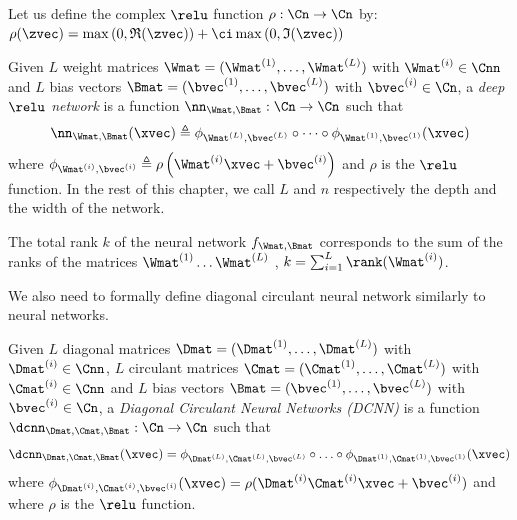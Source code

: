 \begin{definition}
  Let us define the complex $\relu$ function $\rho: \Cn \rightarrow \Cn$ by: $\rho(\zvec) = \max\left(0, \mathfrak{R}(\zvec)\right) + \ci \max\left(0, \mathfrak{I}(\zvec) \right)$
  \label{definition:relu_function}
\end{definition}

\begin{definition} \label{definition:deep_relu_network}
  Given $L$ weight matrices $\Wmat = (\Wmat^{(1)}, \ldots, \Wmat^{(L)})$ with $\Wmat^{(i)} \in \Cnn$ and  $L$ bias vectors $\Bmat = (\bvec^{(1)}, \ldots, \bvec^{(L)})$  with  $\bvec^{(i)} \in \Cn$, a \emph{deep $\relu$ network} is a function $\nn_{\Wmat, \Bmat} : \Cn \rightarrow \Cn$ such that
  \begin{equation}
    \nn_{\Wmat,\Bmat}(\xvec) \triangleq \phi_{\Wmat^{(L)}, \bvec^{(L)}} \circ \cdots \circ \phi_{\Wmat^{(1)}, \bvec^{(1)}}(\xvec)
  \end{equation}
  where $\phi_{\Wmat^{(i)},\bvec^{(i)}} \triangleq \rho\left(\Wmat^{(i)}\xvec + \bvec^{(i)}\right)$ and $\rho$ is the $\relu$ function.
  In the rest of this chapter, we call $L$ and $n$ respectively the depth and the width of the network.
\end{definition}

\begin{definition}
  The total rank $k$ of the neural network $f_{\Wmat, \Bmat}$ corresponds to the sum of the ranks of the matrices $\Wmat^{(1)} \ldots \Wmat^{(L)}$ \ie, $k = \sum_{i=1}^L \rank(\Wmat^{(i)})$.
\end{definition}

\noindent
We also need to formally define diagonal circulant neural network similarly to neural networks.

\begin{definition} \label{definition:DCNN}
  Given $L$ diagonal matrices $\Dmat = (\Dmat^{(1)}, \ldots, \Dmat^{(L)})$ with $\Dmat^{(i)} \in \Cnn$, $L$ circulant matrices $\Cmat = (\Cmat^{(1)}, \ldots, \Cmat^{(L)})$ with $\Cmat^{(i)} \in \Cnn$ and $L$ bias vectors $\Bmat = (\bvec^{(1)}, \ldots, \bvec^{(L)})$ with  $\bvec^{(i)} \in \Cn$, a \emph{Diagonal Circulant Neural Networks (DCNN)} is a function $\dcnn_{\Dmat, \Cmat, \Bmat} : \Cn \rightarrow \Cn$ such that 
  \begin{equation}
    \dcnn_{\Dmat,\Cmat,\Bmat}(\xvec) = \phi_{\Dmat^{(L)}, \Cmat^{(L)}, \bvec^{(L)}} \circ \ldots \circ \phi_{\Dmat^{(1)}, \Cmat^{(1)}, \bvec^{(1)}} (\xvec)
  \end{equation}
   where $\phi_{\Dmat^{(i)}, \Cmat^{(i)}, \bvec^{(i)}}(\xvec) = \rho (\Dmat^{(i)} \Cmat^{(i)} \xvec + \bvec^{(i)})$ and where $\rho$ is the $\relu$ function.
\end{definition}


